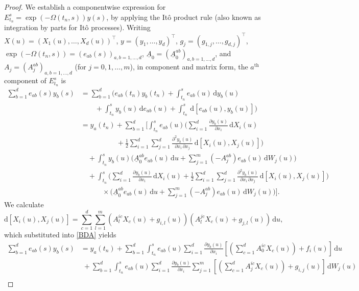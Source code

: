 \documentclass[10pt,a4paper]{amsart}
\begin{document}
\begin{proof}
We establish a componentwise expression for $E_{t_n}^s=\exp(-\Omega(t_n,s))y(s)$, by applying the It\^o product rule (also known as integration by parts for It\^o processes). Writing $X(u)=(X_1(u),\ldots,X_d(u))^\intercal$, $y=(y_1,\ldots,y_d)^\intercal$, $g_j=(g_{1,j},\ldots,g_{d,j})^\intercal$, $\exp(-\Omega(t_n,s))=(e_{ab}(s))_{a,b=1,\ldots,d}$, $\underline{A}_0=(\underline{A}_0^{ab})_{a,b=1,\ldots,d}$, and $A_j=(A_j^{ab})_{a,b=1,\ldots,d}$ (for $j=0,1,\ldots,m$), in component and matrix form, the $a^\mathrm{th}$ component of $E_{t_n}^s$ is
\begin{align}
\sum_{b=1}^de_{ab}(s)y_b(s)&=\sum_{b=1}^d\bigg(e_{ab}(t_n)y_b(t_n)+\int_{t_n}^se_{ab}(u)\,\mathrm{d}y_b(u)\nonumber\\
&\quad\quad+\int_{t_n}^sy_b(u)\,\mathrm{d}e_{ab}(u)+\int_{t_n}^s\,\mathrm{d}\left[e_{ab}(u),y_b(u)\right]\bigg)\nonumber\\
&=y_a(t_n)+\sum_{b=1}^d\bigg[\int_{t_n}^se_{ab}(u)\bigg(\sum_{i=1}^d\frac{\partial y_b(u)}{\partial x_i}\,\mathrm{d}X_i(u)\label{BDA}\\
&\quad\quad\quad\quad\quad+\frac{1}{2}\sum_{i=1}^d\sum_{j=1}^d\frac{\partial^2y_b(u)}{\partial x_i\,\partial x_j}\,\mathrm{d}\left[X_i(u),X_j(u)\right]\bigg)\nonumber\\
&\quad+\int_{t_n}^sy_b(u)\bigg(\underline{A}_0^{ab}e_{ab}(u)\,\mathrm{d}u+\sum_{j=1}^m\left(-A_j^{ab}\right)e_{ab}(u)\,\mathrm{d}W_j(u)\bigg)\nonumber\\
&\quad+\int_{t_n}^s\bigg(\sum_{i=1}^d\frac{\partial y_b(u)}{\partial x_i}\,\mathrm{d}X_i(u)+\frac{1}{2}\sum_{i=1}^d\sum_{j=1}^d\frac{\partial^2y_b(u)}{\partial x_i\,\partial x_j}\,\mathrm{d}\left[X_i(u),X_j(u)\right]\bigg)\nonumber\\
&\quad\quad\quad\times\bigg(\underline{A}_0^{ab}e_{ab}(u)\,\mathrm{d}u+\sum_{j=1}^m\left(-A_j^{ab}\right)e_{ab}(u)\,\mathrm{d}W_j(u)\bigg)\bigg].\nonumber
\end{align}
We calculate
\[\mathrm{d}[X_i(u),X_j(u)]=\sum_{c=1}^d\sum_{l=1}^m\left(A_l^{ic}X_c(u)+g_{i,l}(u)\right)\left(A_l^{jc}X_c(u)+g_{j,l}(u)\right)\,\mathrm{d}u,\]
which substituted into \cref{BDA} yields
\begin{align}
\sum_{b=1}^de_{ab}(s)y_b(s)&=y_a(t_n)+\sum_{b=1}^d\int_{t_n}^se_{ab}(u)\sum_{i=1}^d\frac{\partial y_b(u)}{\partial x_i}\left[\left(\sum_{c=1}^dA_0^{ic}X_c(u)\right)+f_i(u)\right]\,\mathrm{d}u\nonumber\\
&\;+\sum_{b=1}^d\int_{t_n}^se_{ab}(u)\sum_{i=1}^d\frac{\partial y_b(u)}{\partial x_i}\sum_{j=1}^m\left[\left(\sum_{c=1}^dA_j^{ic}X_c(u)\right)+g_{i,j}(u)\right]\,\mathrm{d}W_j(u)\label{BEA}\\

\end{align}
\end{proof}
\end{document}
